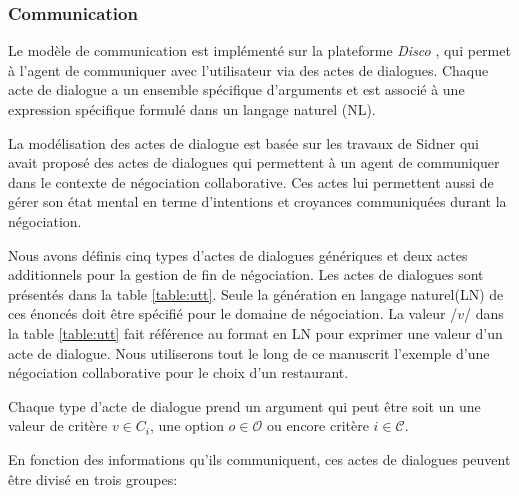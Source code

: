 	\subsubsection{Communication}
	\label{sec:communication}
		Le modèle de communication est implémenté sur la plateforme \emph{Disco} \cite{rich09}, qui permet à l'agent de communiquer avec l'utilisateur via des actes de dialogues. Chaque acte de dialogue a un ensemble spécifique d'arguments et est associé à une expression spécifique formulé dans un langage naturel (NL).
		
		La modélisation des actes de dialogue est basée sur les travaux de Sidner \cite{sidner1994artificial} qui avait proposé des actes de dialogues qui permettent à un agent de communiquer dans le contexte de négociation collaborative. Ces actes lui permettent aussi de gérer son état mental en terme d'intentions et croyances communiquées durant la négociation. 
		
		Nous avons définis cinq types d'actes de dialogues génériques et deux actes additionnels pour la gestion de fin de négociation. Les actes de dialogues sont présentés dans la table \ref{table:utt}. Seule la génération en langage naturel(LN) de ces énoncés doit être spécifié pour le domaine de négociation. La valeur /$v$/ dans la table \ref{table:utt} fait référence au format en LN pour exprimer une valeur d'un acte de dialogue.
		Nous utiliserons tout le long de ce manuscrit l'exemple d'une négociation collaborative pour le choix d'un restaurant. 
		
		Chaque type d'acte de dialogue prend un argument qui peut être soit un une valeur de critère  $v \in C_i$, une option $o \in \mathcal{O}$ ou encore critère $i \in \mathcal{C}$. 
		
		En fonction des informations qu'ils communiquent, ces actes de dialogues peuvent être divisé en trois groupes:
		
